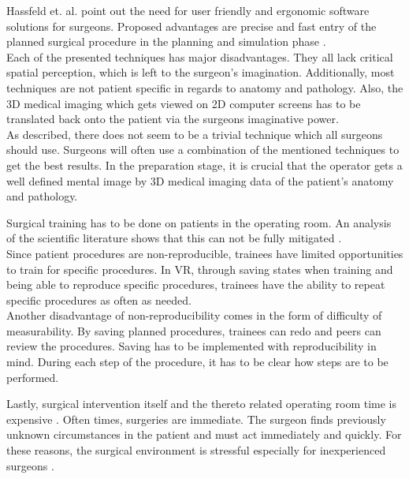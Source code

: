 Hassfeld et. al. point out the need for user friendly and ergonomic software solutions for surgeons.
Proposed advantages are precise and fast entry of the planned surgical procedure in the planning and simulation phase \cite{HASSFELD20012}.
\\ Each of the presented techniques has major disadvantages.
They all lack critical spatial perception, which is left to the surgeon's imagination.
Additionally, most techniques are not patient specific in regards to anatomy and pathology.
Also, the 3D medical imaging which gets viewed on 2D computer screens has to be translated back onto the patient via the surgeons imaginative power.
\\ As described, there does not seem to be a trivial technique which all surgeons should use.
Surgeons will often use a combination of the mentioned techniques to get the best results.
In the preparation stage, it is crucial that the operator gets a well defined mental image by 3D medical imaging data of the patient's anatomy and pathology.

Surgical training has to be done on patients in the operating room.
An analysis of the scientific literature shows that this can not be fully mitigated \cite{mcgaghie2011does}.
\\ Since patient procedures are non-reproducible, trainees have limited opportunities to train for specific procedures.
In VR, through saving states when training and being able to reproduce specific procedures, trainees have the ability to repeat specific procedures as often as needed.
\\ Another disadvantage of non-reproducibility comes in the form of difficulty of measurability.
By saving planned procedures, trainees can redo and peers can review the procedures.
Saving has to be implemented with reproducibility in mind.
During each step of the procedure, it has to be clear how steps are to be performed.

Lastly, surgical intervention itself and the thereto related operating room time is expensive \cite{Barber.2020}.
Often times, surgeries are immediate.
The surgeon finds previously unknown circumstances in the patient and must act immediately and quickly.
For these reasons, the surgical environment is stressful especially for inexperienced surgeons \cite{schuetz2008three}.